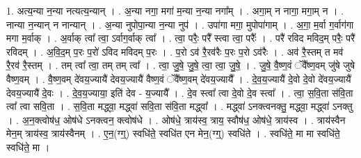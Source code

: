 \documentclass[17pt]{extarticle}
\begin{document}
1. अत्य॒न्या न॒न्या नत्यत्य॒न्यान् । . अ॒न्या नगा॒ मगा॑ म॒न्या न॒न्या नगा᳚म् । . अगा॒म् न नागा॒ मगा॒म् न । . नान्या न॒न्यान् न नान्यान् । . अ॒न्या नुपोपा॒न्या न॒न्या नुप॑ । . उपा॑गा मगा॒ मुपोपा॑गाम् । . अ॒गा॒ म॒र्वा ग॒र्वाग॑गा मगा म॒र्वाक् । . अ॒र्वाक् त्वा᳚ त्वा॒ ऽर्वाग॒र्वाक् त्वा᳚ । . त्वा॒ परैः॒ परै᳚ स्त्वा त्वा॒ परैः᳚ । . परै॑ रविद मविद॒म् परैः॒ परै॑ रविदम् । . अ॒वि॒द॒म् प॒रः प॒रो॑ ऽविद मविदम् प॒रः । . प॒रो ऽव॑ रै॒रव॑रैः प॒रः प॒रो ऽव॑रैः । . अव॑ रै॒स्तम् त मव॑ रै॒रव॑ रै॒स्तम् । . तम् त्वा᳚ त्वा॒ तम् तम् त्वा᳚ । . त्वा॒ जु॒षे॒ जु॒षे॒ त्वा॒ त्वा॒ जु॒षे॒ । . जु॒षे॒ वै॒ष्ण॒वं ॅवै᳚ष्ण॒वम् जु॑षे जुषे वैष्ण॒वम् । . वै॒ष्ण॒वम् दे॑वय॒ज्यायै॑ देवय॒ज्यायै॑ वैष्ण॒वं ॅवै᳚ष्ण॒वम् दे॑वय॒ज्यायै᳚ । . दे॒व॒य॒ज्यायै॑ दे॒वो दे॒वो दे॑वय॒ज्यायै॑ देवय॒ज्यायै॑ दे॒वः । . दे॒व॒य॒ज्याया॒ इति॑ देव - य॒ज्यायै᳚ । . दे॒व स्त्वा᳚ त्वा दे॒वो दे॒व स्त्वा᳚ । . त्वा॒ स॒वि॒ता स॑वि॒ता त्वा᳚ त्वा सवि॒ता । . स॒वि॒ता मद्ध्वा॒ मद्ध्वा॑ सवि॒ता स॑वि॒ता मद्ध्वा᳚ । . मद्ध्वा॑ ऽनक्त्वनक्तु॒ मद्ध्वा॒ मद्ध्वा॑ ऽनक्तु । . अ॒न॒क्त्वोष॑ध॒ ओष॑धे ऽनक्त्वन॒ क्त्वोष॑धे । . ओष॑धे॒ त्राय॑स्व॒ त्राय॒ स्वौष॑ध॒ ओष॑धे॒ त्राय॑स्व । . त्राय॑स्वैन मेन॒म् त्राय॑स्व॒ त्राय॑स्वैनम् । . ए॒न॒(ग्ग्॒) स्वधि॑ते॒ स्वधि॑त एन मेन॒(ग्ग्॒) स्वधि॑ते । . स्वधि॑ते॒ मा मा स्वधि॑ते॒ स्वधि॑ते॒ मा । \newline
\end{document}
